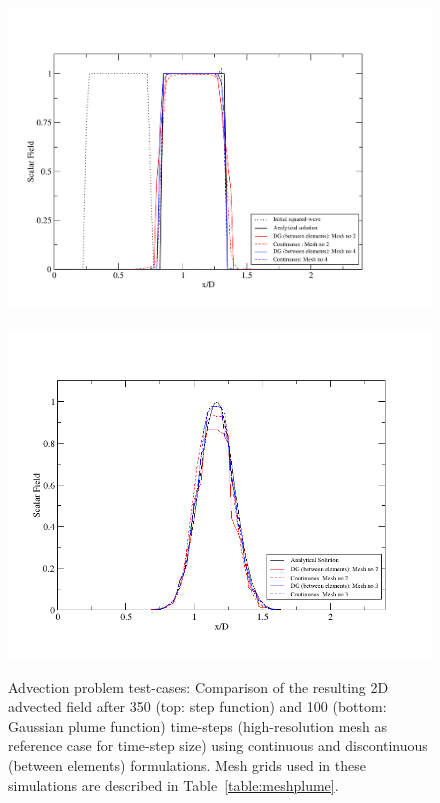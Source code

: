 \begin{figure}[h]
\begin{center}
\vbox{\vspace{-1.5cm}\hbox{
\includegraphics[width=15.5cm,height=10.cm]{./diagrams/Step_P1DG-P2Cont}}
\vspace{-.5cm}
\hbox{
\includegraphics[width=15.5cm,height=10.cm]{./diagrams/Plume_P1DG-P2Cont}}}\vspace{-1cm}
\caption{Advection problem test-cases: Comparison of the resulting 2D advected field after 350 (top: step function) and 100 (bottom: Gaussian plume function) time-steps (high-resolution mesh as reference case for time-step size) using continuous and discontinuous (between elements) formulations. Mesh grids used in these simulations are described in Table~\ref{table:meshplume}.\label{2D_Sanpshot_Adv2D}}
\end{center}
\end{figure}



